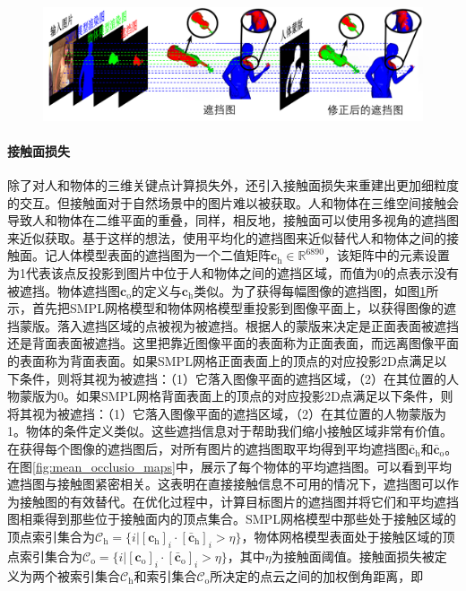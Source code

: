 \begin{figure}[!htbp]
	\centering
	\includegraphics{Img/acquire_occlusion_maps}
	\label{fig:acquire_occlusion_maps}
\end{figure}

\paragraph{接触面损失}
除了对人和物体的三维关键点计算损失外，还引入接触面损失来重建出更加细粒度的交互。但接触面对于自然场景中的图片难以被获取。人和物体在三维空间接触会导致人和物体在二维平面的重叠，同样，相反地，接触面可以使用多视角的遮挡图来近似获取。基于这样的想法，使用平均化的遮挡图来近似替代人和物体之间的接触面。记人体模型表面的遮挡图为一个二值矩阵$\mathbf{c}_{\text{h}}\in\mathbb{R}^{6890}$，该矩阵中的元素设置为1代表该点反投影到图片中位于人和物体之间的遮挡区域，而值为0的点表示没有被遮挡。物体遮挡图$\mathbf{c}_{\text{o}}$的定义与$\mathbf{c}_{\text{h}}$类似。为了获得每幅图像的遮挡图，如图\ref{fig:acquire_occlusion_maps}所示，首先把SMPL网格模型和物体网格模型重投影到图像平面上，以获得图像的遮挡蒙版。落入遮挡区域的点被视为被遮挡。根据人的蒙版来决定是正面表面被遮挡还是背面表面被遮挡。这里把靠近图像平面的表面称为正面表面，而远离图像平面的表面称为背面表面。如果SMPL网格正面表面上的顶点的对应投影2D点满足以下条件，则将其视为被遮挡：（1）它落入图像平面的遮挡区域，（2）在其位置的人物蒙版为0。如果SMPL网格背面表面上的顶点的对应投影2D点满足以下条件，则将其视为被遮挡：（1）它落入图像平面的遮挡区域，（2）在其位置的人物蒙版为1。物体的条件定义类似。这些遮挡信息对于帮助我们缩小接触区域非常有价值。在获得每个图像的遮挡图后，对所有图片的遮挡图取平均得到平均遮挡图$\bar{\mathbf{c}}_{\text{h}}$和$\bar{\mathbf{c}}_{\text{o}}$。在图\ref{fig:mean_occlusio_maps}中，展示了每个物体的平均遮挡图。可以看到平均遮挡图与接触图紧密相关。这表明在直接接触信息不可用的情况下，遮挡图可以作为接触图的有效替代。在优化过程中，计算目标图片的遮挡图并将它们和平均遮挡图相乘得到那些位于接触面内的顶点集合。SMPL网格模型中那些处于接触区域的顶点索引集合为$\mathcal{C}_{\text{h}} = \{i| [\mathbf{c}_{\text{h}}]_i \cdot [\bar{\mathbf{c}}_{\text{h}}]_i > \eta\}$，物体网格模型表面处于接触区域的顶点索引集合为$\mathcal{C}_{\text{o}} = \{i| [\mathbf{c}_{\text{o}}]_i \cdot [\bar{\mathbf{c}}_{\text{o}}]_i > \eta\}$，其中$\eta$为接触面阈值。接触面损失被定义为两个被索引集合$\mathcal{C}_{\text{h}}$和索引集合$\mathcal{C}_{\text{o}}$所决定的点云之间的加权倒角距离，即
